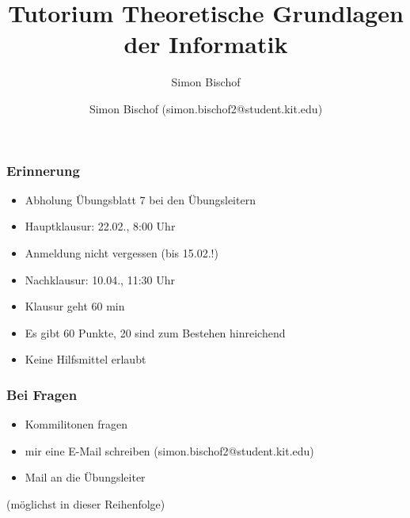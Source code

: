 \documentclass{beamer}
\author{Simon Bischof (simon.bischof2@student.kit.edu)}
\title{Tutorium Theoretische Grundlagen der Informatik}
\subtitle{Simon Bischof}
\institute{Institut f\"{u}r Kryptographie und Sicherheit}
\begin{document}
\begin{frame}
\maketitle
\end{frame}

\begin{frame}
\frametitle{Erinnerung}
\begin{itemize}
\item Abholung Übungsblatt 7 bei den Übungsleitern
\item Hauptklausur: 22.02., 8:00 Uhr
\item Anmeldung nicht vergessen (bis 15.02.!)
\item Nachklausur: 10.04., 11:30 Uhr
\item Klausur geht 60 min
\item Es gibt 60 Punkte, 20 sind zum Bestehen hinreichend
\item Keine Hilfsmittel erlaubt
\end{itemize}
\end{frame}

\begin{frame}
\frametitle{Bei Fragen}
\begin{itemize}
\item Kommilitonen fragen
\item mir eine E-Mail schreiben (simon.bischof2@student.kit.edu)
\item Mail an die Übungsleiter
\end{itemize}
(möglichst in dieser Reihenfolge)
\end{frame}
\end{document}
